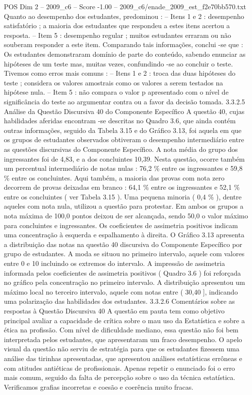 \begin{textsample}{POS Dim 2 – 2009\_c6 – Score -1.00 – 2009\_c6/enade\_2009\_est\_f2e70bb570.txt}
Quanto ao desempenho dos estudantes, predominou : – Itens 1 e 2 : desempenho satisfatório ; a maioria dos estudantes que respondeu a estes itens acertou a resposta. – Item 5 : desempenho regular ; muitos estudantes erraram ou não souberam responder a este item.
Comparando tais informações, conclui -se que : Os estudantes demonstraram domínio de parte do conteúdo, sabendo enunciar as hipóteses de um teste mas, muitas vezes, confundindo -se ao concluir o teste.
Tivemos como erros mais comuns : – Itens 1 e 2 : troca das duas hipóteses do teste ; considera os valores amostrais como os valores a serem testados na hipótese nula. – Item 5 : não compara o valor p apresentado com o nível de significância do teste ao argumentar contra ou a favor da decisão tomada. 3.3.2.5 Análise da Questão Discursiva 40 do Componente Específico A questão 40, cujas habilidades aferidas encontram -se descritas no Quadro 3.6, que ainda contém outras informações, seguido da Tabela 3.15 e do Gráfico 3.13, foi aquela em que os grupos de estudantes observados obtiveram o desempenho intermediário entre as questões discursivas do Componente Específico.
A nota média do grupo dos ingressantes foi de 4,83, e a dos concluintes 10,39.
Nesta questão, ocorre também um percentual intermediário de notas nulas : 76,2 \% entre os ingressantes e 59,8 \% entre os concluintes.
Aqui também, a maioria das provas com nota zero decorrem de provas deixadas em branco : 64,1 \% entre os ingressantes e 52,1 \% entre os concluintes ( ver Tabela 3.15 ).
Uma pequena minoria ( 0,4 \% ), dentre aqueles com nota nula, utilizou a questão para protestar.
Em ambos os grupos a nota máxima de 100,0 pontos deixou de ser alcançada, sendo 50,0 o valor máximo para concluintes e ingressantes.
Os coeficientes de assimetria positivos indicam uma concentração à esquerda e espalhamento à direita.
O Gráfico 3.13 apresenta a distribuição das notas na questão 40 discursiva do Componente Específico por grupo de estudantes.
A moda se situou no primeiro intervalo, aquele com valores entre 0 e 10 incluindo os extremos do intervalo.
A impressão de assimetria informada pelos coeficientes de assimetria positivos ( Quadro 3.6 ) foi reforçada no gráfico pela concentração no primeiro intervalo.
A distribuição apresentou um máximo local no terceiro intervalo, aquele com notas entre ( 30,40 ], indicando uma polarização das habilidades dos estudantes. 3.3.2.6 Comentários sobre as respostas à Questão Discursiva 40 A questão em pauta tem como objetivo principal avaliar a capacidade de crítica sobre o mau uso da Estatística e sobre a ética na profissão.
Com nível de dificuldade mediano, essa questão não foi bem interpretada pelos estudantes, que apresentaram um fraco desempenho.
O apelo visual da questão não serviu de estratégia para que os estudantes fizessem uma análise das tirinhas apresentadas, que apresentou análises estatísticas errôneas e com atitudes antiéticas de profissionais.
Apenas repetir o enunciado foi o erro mais comum, seguido da falta de percepção sobre o uso da técnica estatística.
Verificamos grafias incorretas e coesão e coerência muito fracas.

\end{textsample}
